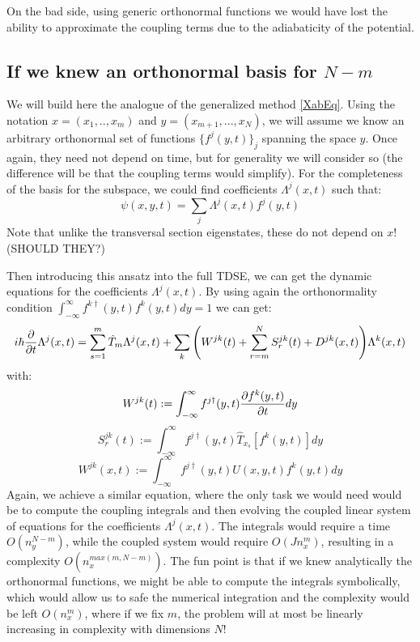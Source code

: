 \documentclass[11pt, a4paper]{article} %
\begin{document}
On the bad side, using generic orthonormal functions we would have lost the ability to approximate the coupling terms due to the adiabaticity of the potential.

\subsection{If we knew an orthonormal basis for $N-m$}
We will build here the analogue of the generalized method \eqref{XabEq}. Using the notation $x=(x_1,..,x_m)$ and $y=(x_{m+1},...,x_N)$, we will assume we know an arbitrary orthonormal set of functions $\{ f^j(y,t) \}_j$ spanning the space $y$. Once again, they need not depend on time, but for generality we will consider so (the difference will be that the coupling terms would simplify). For the completeness of the basis for the subspace, we could find coefficients $\Lambda^j(x,t)$ such that:
\begin{equation}
\psi(x,y,t)=\sum_j \Lambda^j(x,t) f^j(y,t)
\end{equation}
Note that unlike the transversal section eigenstates, these do not depend on $x$! (SHOULD THEY?)

Then introducing this ansatz into the full TDSE, we can get the dynamic equations for the coefficients $\Lambda^j(x,t)$. By using again the orthonormality condition $\int_{-\infty}^{\infty}f^{k\dagger}(y,t)f^k(y,t)dy=1$ we can get:
\begin{equation}
i\hbar \pdv{}{t}\Lambda^j(x,t)= \sum_{s=1}^m \hat{T}_m \Lambda^j(x,t) + \sum_k \qty( W^{jk}(t)+\sum_{r=m}^NS^{jk}_r(t)+D^{jk}(x,t) )\Lambda^k(x,t)
\end{equation}
with:
\begin{equation}
W^{jk}(t):=\int_{-\infty}^{\infty}f^{j\dagger}(y,t) \pdv{f^k(y,t)}{t} dy
\end{equation}
\begin{equation}
S^{jk}_r(t):=\int_{-\infty}^{\infty}f^{j\dagger}(y,t) \hat{T}_{x_s}[f^k(y,t)] dy
\end{equation}
\begin{equation}
W^{jk}(x,t):=\int_{-\infty}^{\infty}f^{j\dagger}(y,t)U(x,y,t) f^k(y,t) dy
\end{equation}
Again, we achieve a similar equation, where the only task we would need would be to compute the coupling integrals and then evolving the coupled linear system of equations for the coefficients $\Lambda^j(x,t)$. The integrals would require a time $O(n_y^{N-m})$, while the coupled system would require $O(Jn_x^m)$, resulting in a complexity $O(n_x^{max(m, N-m)})$. The fun point is that if we knew analytically the orthonormal functions, we might be able to compute the integrals symbolically, which would allow us to safe the numerical integration and the complexity would be left $O(n_x^m)$, where if we fix $m$, the problem will at most be linearly increasing in complexity with dimensions $N$!
\end{document}
